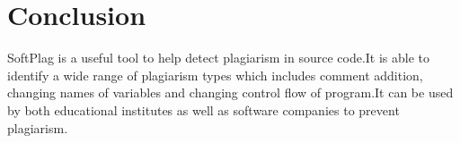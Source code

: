 \chapter{Conclusion }

SoftPlag is a useful tool to help detect plagiarism in source code.It is able to identify a wide range of plagiarism types which includes comment addition, changing names of variables and changing control flow of program.It can be used by both educational institutes as well as software companies to prevent plagiarism.

